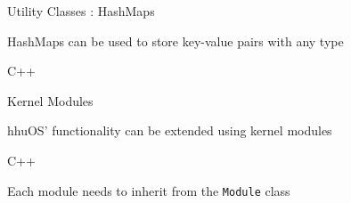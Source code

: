 \begin{frame}{Utility Classes : HashMaps}

\begin{center}
	HashMaps can be used to store key-value pairs with any type
\end{center}

\begin{center}
	\begin{minipage}{0.79\textwidth}
		\begin{codeblock}{C++}
		\end{codeblock}
	\end{minipage}
	
	\vspace{5pt}
	
	\begin{minipage}{0.41\textwidth}
		\begin{terminalblock}
			\color{termfg}
		\end{terminalblock}
	\end{minipage}
\end{center}

\end{frame}

\begin{frame}{Kernel Modules}

\begin{center}
	hhuOS' functionality can be extended using kernel modules
\end{center}

\begin{center}
	\begin{minipage}{\textwidth}
		\begin{codeblock}{C++}
		\end{codeblock}
	\end{minipage}
\end{center}

\begin{center}
	Each module needs to inherit from the \texttt{Module} class
\end{center}

\end{frame}

